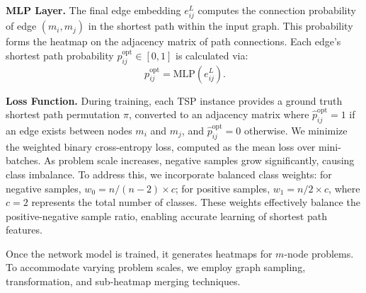 \documentclass[sigconf]{acmart}
\begin{document}
\textbf{MLP Layer.} The final edge embedding $e_{ij}^{L}$ computes the connection probability of edge $(m_i, m_j)$ in the shortest path within the input graph. This probability forms the heatmap on the adjacency matrix of path connections. Each edge's shortest path probability $p_{ij}^{\text{opt}} \in [0, 1]$ is calculated via:
\begin{equation}
    \ p_{ij}^{\mathrm{opt}}=\mathrm{MLP}(e_{ij}^{L}).
\end{equation}


\textbf{Loss Function.} During training, each TSP instance provides a ground truth shortest path permutation $\pi$, converted to an adjacency matrix where $\hat{p}_{ij}^{\text{opt}}=1$ if an edge exists between nodes $m_i$ and $m_j$, and $\hat{p}_{ij}^{\text{opt}}=0$ otherwise. We minimize the weighted binary cross-entropy loss, computed as the mean loss over mini-batches. As problem scale increases, negative samples grow significantly, causing class imbalance. To address this, we incorporate balanced class weights: for negative samples, $w_0 = {n}/{(n - 2) \times c}$; for positive samples, $w_1 = {n}/{2 \times c}$, where $c = 2$ represents the total number of classes. These weights effectively balance the positive-negative sample ratio, enabling accurate learning of shortest path features.

Once the network model is trained, it generates heatmaps for $m$-node problems. To accommodate varying problem scales, we employ graph sampling, transformation, and sub-heatmap merging techniques.
\end{document}
